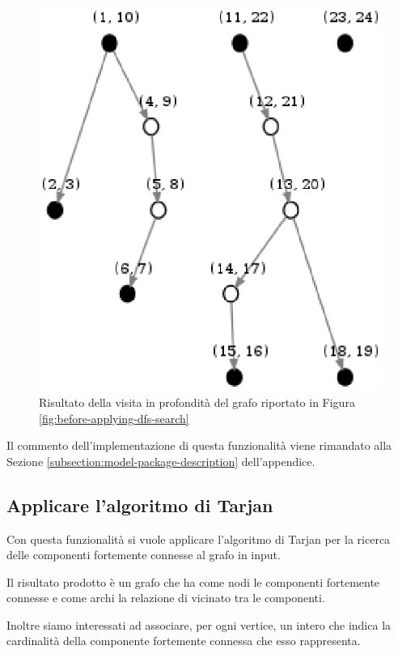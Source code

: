 \begin{figure}
  \centering
  \includegraphics{images/OnePipingLevelUnitTest_Printer_DFS_PrinterPipe_Papadimitriou-phase-PrinterPipeFilter-level-2.eps}
  \caption{Risultato della visita in profondit\`a del grafo riportato
    in Figura \ref{fig:before-applying-dfs-search}}
  \label{fig:dfs-forest}
\end{figure}

Il commento dell'implementazione di questa funzionalit\`a viene
rimandato alla Sezione \ref{subsection:model-package-description}
dell'appendice.

\subsection{Applicare l'algoritmo di Tarjan}
\label{subsection:use-case-tarjan}
Con questa funzionalit\`a si vuole applicare l'algoritmo di Tarjan per
la ricerca delle componenti fortemente connesse al grafo in input.

Il risultato prodotto \`e un grafo che ha come nodi le componenti
fortemente connesse e come archi la relazione di vicinato tra le
componenti.

Inoltre siamo interessati ad associare, per ogni vertice, un intero
che indica la cardinalit\`a della componente fortemente connessa che
esso rappresenta.

